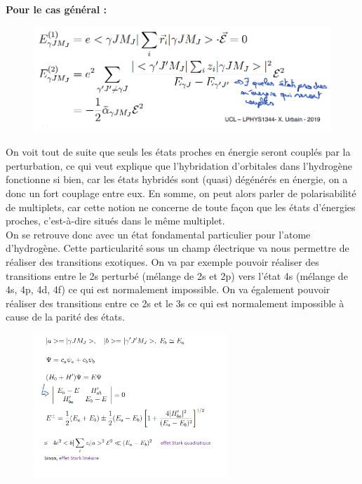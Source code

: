 \textbf{Pour le cas général :}\\

\begin{figure}[H]
    \centering
    \includegraphics[scale=0.8]{Images2/correcordre.PNG}
\end{figure}

On voit tout de suite que seuls les états proches en énergie seront couplés par la perturbation, ce qui veut explique que l'hybridation d'orbitales dans l'hydrogène fonctionne si bien, car les états hybridés sont (quasi) dégénérés en énergie, on a donc un fort couplage entre eux. En somme, on peut alors parler de polarisabilité de multiplets, car cette notion ne concerne de toute façon que les états d'énergies proches, c'est-à-dire situés dans le même multiplet.\\

On se retrouve donc avec un état fondamental particulier pour l'atome d'hydrogène. Cette particularité sous un champ électrique va nous permettre de réaliser des transitions exotiques. On va par exemple pouvoir réaliser des transitions entre le 2s perturbé (mélange de 2s et 2p) vers l'état 4s (mélange de 4s, 4p, 4d, 4f) ce qui est normalement impossible. On va également pouvoir réaliser des transitions entre ce 2s et le 3s ce qui est normalement impossible à cause de la parité des états.\\

\begin{figure}[H]
    \centering
    \includegraphics[width=0.65\textwidth]{Images2/EffetStark.PNG}
\end{figure}

